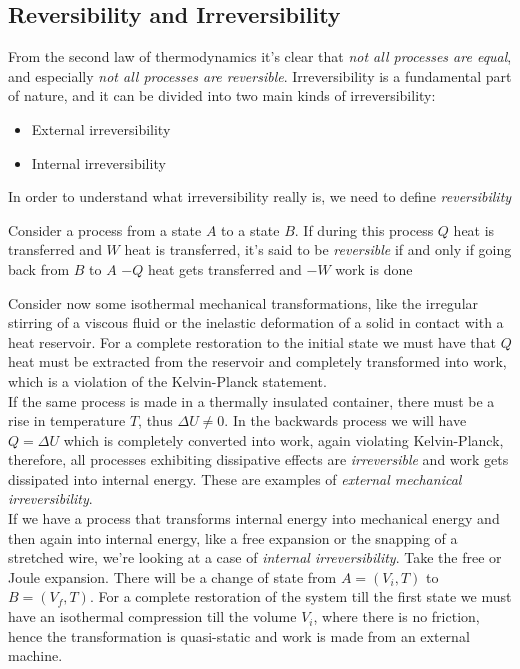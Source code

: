 \documentclass[../qm.tex]{subfiles}
\begin{document}
\subsection{Reversibility and Irreversibility}
From the second law of thermodynamics it's clear that \textit{not all processes are equal}, and especially \textit{not all processes are reversible}. Irreversibility is a fundamental part of nature, and it can be divided into two main kinds of irreversibility:
\begin{itemize}
\item External irreversibility
\item Internal irreversibility
\end{itemize}
In order to understand what irreversibility really is, we need to define \textit{reversibility}
\begin{dfn}
	Consider a process from a state $A$ to a state $B$. If during this process $Q$ heat is transferred and $W$ heat is transferred, it's said to be \emph{reversible} if and only if going back from $B$ to $A$ $-Q$ heat gets transferred and $-W$ work is done
\end{dfn}
Consider now some isothermal mechanical transformations, like the irregular stirring of a viscous fluid or the inelastic deformation of a solid in contact with a heat reservoir. For a complete restoration to the initial state we must have that $Q$ heat must be extracted from the reservoir and completely transformed into work, which is a violation of the Kelvin-Planck statement.\\
If the same process is made in a thermally insulated container, there must be a rise in temperature $T$, thus $\Delta U\ne0$. In the backwards process we will have $Q=\Delta U$ which is completely converted into work, again violating Kelvin-Planck, therefore, all processes exhibiting dissipative effects are \textit{irreversible} and work gets dissipated into internal energy. These are examples of \emph{external mechanical irreversibility}.\\
If we have a process that transforms internal energy into mechanical energy and then again into internal energy, like a free expansion or the snapping of a stretched wire, we're looking at a case of \emph{internal irreversibility}. Take the free or Joule expansion. There will be a change of state from $A=\left( V_i, T \right)$ to $B=\left( V_f, T \right)$. For a complete restoration of the system till the first state we must have an isothermal compression till the volume $V_i$, where there is no friction, hence the transformation is quasi-static and work is made from an external machine.\\
\end{document}
